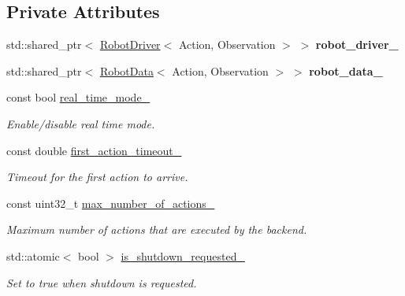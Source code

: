 \subsection*{Private Attributes}
\begin{DoxyCompactItemize}
\item 
\mbox{\label{classrobot__interfaces_1_1RobotBackend_a9c07b9b4a8c98b3f1b63d0754cbcb85b}} 
std\+::shared\+\_\+ptr$<$ \hyperlink{classrobot__interfaces_1_1RobotDriver}{Robot\+Driver}$<$ Action, Observation $>$ $>$ {\bfseries robot\+\_\+driver\+\_\+}
\item 
\mbox{\label{classrobot__interfaces_1_1RobotBackend_a4bb04e584d971d4d99a32ea8c5b0cd68}} 
std\+::shared\+\_\+ptr$<$ \hyperlink{classrobot__interfaces_1_1RobotData}{Robot\+Data}$<$ Action, Observation $>$ $>$ {\bfseries robot\+\_\+data\+\_\+}
\item 
const bool \hyperlink{classrobot__interfaces_1_1RobotBackend_a81610183c52c9fe2088304bbd3b6f83f}{real\+\_\+time\+\_\+mode\+\_\+}
\begin{DoxyCompactList}\small\item\em Enable/disable real time mode. \end{DoxyCompactList}\item 
const double \hyperlink{classrobot__interfaces_1_1RobotBackend_a56f111a9e0663eedefbaf55de36f7cac}{first\+\_\+action\+\_\+timeout\+\_\+}
\begin{DoxyCompactList}\small\item\em Timeout for the first action to arrive. \end{DoxyCompactList}\item 
const uint32\+\_\+t \hyperlink{classrobot__interfaces_1_1RobotBackend_a7cac555549bff96a32da042a97919d47}{max\+\_\+number\+\_\+of\+\_\+actions\+\_\+}
\begin{DoxyCompactList}\small\item\em Maximum number of actions that are executed by the backend. \end{DoxyCompactList}\item 
std\+::atomic$<$ bool $>$ \hyperlink{classrobot__interfaces_1_1RobotBackend_abe24206dcf102b33f8ee472e287f485a}{is\+\_\+shutdown\+\_\+requested\+\_\+}
\begin{DoxyCompactList}\small\item\em Set to true when shutdown is requested. \end{DoxyCompactList}\item 

\end{DoxyCompactItemize}
